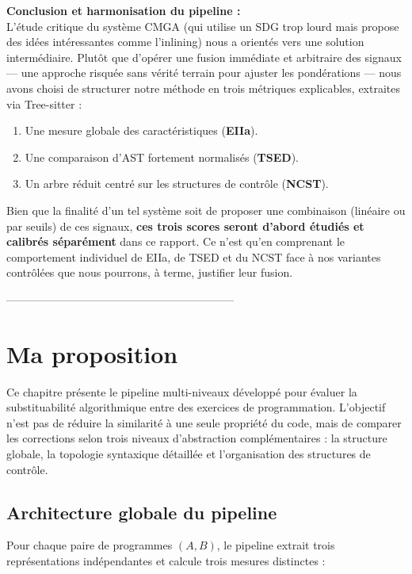 \vspace{0.5cm}

\textbf{Conclusion et harmonisation du pipeline :}\\
L'étude critique du système CMGA (qui utilise un SDG trop lourd mais propose des idées intéressantes comme l'inlining) nous a orientés vers une solution intermédiaire. Plutôt que d'opérer une fusion immédiate et arbitraire des signaux --- une approche risquée sans vérité terrain pour ajuster les pondérations --- nous avons choisi de structurer notre méthode en trois métriques explicables, extraites via Tree-sitter :
\begin{enumerate}
    \item Une mesure globale des caractéristiques (\textbf{EIIa}).
    \item Une comparaison d'AST fortement normalisés (\textbf{TSED}).
    \item Un arbre réduit centré sur les structures de contrôle (\textbf{NCST}).
\end{enumerate}
Bien que la finalité d'un tel système soit de proposer une combinaison (linéaire ou par seuils) de ces signaux, \textbf{ces trois scores seront d'abord étudiés et calibrés séparément} dans ce rapport. Ce n'est qu'en comprenant le comportement individuel de EIIa, de TSED et du NCST face à nos variantes contrôlées que nous pourrons, à terme, justifier leur fusion.


--------------------------------------------------------------






\chapter{Ma proposition}

Ce chapitre présente le pipeline multi-niveaux développé pour évaluer la
substituabilité algorithmique entre des exercices de programmation. L'objectif
n'est pas de réduire la similarité à une seule propriété du code, mais de
comparer les corrections selon trois niveaux d'abstraction complémentaires :
la structure globale, la topologie syntaxique détaillée et l'organisation des
structures de contrôle.

\section{Architecture globale du pipeline}

Pour chaque paire de programmes $(A,B)$, le pipeline extrait trois
représentations indépendantes et calcule trois mesures distinctes :


